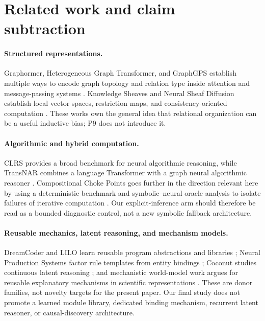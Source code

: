 \section{Related work and claim subtraction}

\paragraph{Structured representations.}
Graphormer, Heterogeneous Graph Transformer, and GraphGPS establish multiple ways to encode graph topology and relation type inside attention and message-passing systems \citep{ying2021graphormer,hu2020hgt,rampasek2022gps}. Knowledge Sheaves and Neural Sheaf Diffusion establish local vector spaces, restriction maps, and consistency-oriented computation \citep{gebhart2021knowledge,bodnar2022sheaf}. These works own the general idea that relational organization can be a useful inductive bias; P9 does not introduce it.

\paragraph{Algorithmic and hybrid computation.}
CLRS provides a broad benchmark for neural algorithmic reasoning, while TransNAR combines a language Transformer with a graph neural algorithmic reasoner \citep{velickovic2022clrs,bounsi2024transnar}. Compositional Choke Points goes further in the direction relevant here by using a deterministic benchmark and symbolic--neural oracle analysis to isolate failures of iterative computation \citep{anonymous2026chokepoints}. Our explicit-inference arm should therefore be read as a bounded diagnostic control, not a new symbolic fallback architecture.

\paragraph{Reusable mechanics, latent reasoning, and mechanism models.}
DreamCoder and LILO learn reusable program abstractions and libraries \citep{ellis2020dreamcoder,grand2023lilo}; Neural Production Systems factor rule templates from entity bindings \citep{goyal2021nps}; Coconut studies continuous latent reasoning \citep{hao2024coconut}; and mechanistic world-model work argues for reusable explanatory mechanisms in scientific representations \citep{posner2026mwm}. These are donor families, not novelty targets for the present paper. Our final study does not promote a learned module library, dedicated binding mechanism, recurrent latent reasoner, or causal-discovery architecture.

